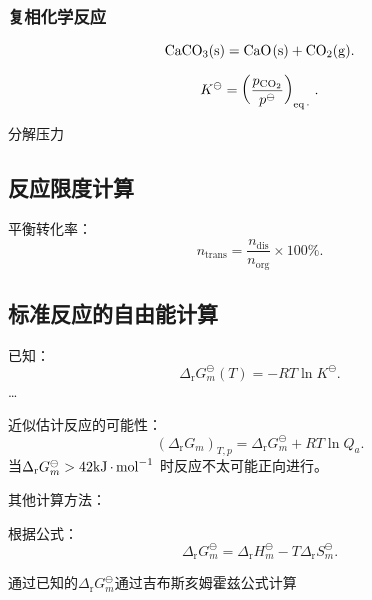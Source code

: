 \subsubsection*{复相化学反应}%
\label{subsub*:复相化学反应}
\begin{eg}
     \[
        \ce{CaCO_3(s)}=\ce{CaO(s)}+\ce{CO_2(g)}
    .\]
\end{eg}
\[
    K^\ominus = \left( \frac{p_\text{\ce{CO2}}}{p^\ominus} \right)_{\ce{eq.}}^{}
.\]
\begin{notation}
    分解压力
\end{notation}
\subsection{反应限度计算}%
\label{sub:反应限度计算}
\begin{notation}
    平衡转化率：\[
        n_\text{trans} = \frac{n_\text{dis}}{n_\text{org}}\times 100\%
    .\]
\end{notation}
\subsection{标准反应的自由能计算}%
\label{sub:标准反应的自由能计算}
已知：\[
    \Delta_\text{r}G_{m}^\ominus \left( T \right) = -RT\ln K^\ominus
.\]\ldots 
\begin{notation}
    近似估计反应的可能性：
    \[
        \left( \Delta_\text{r}G_{m}  \right)_{T,p} = \Delta_\text{r}G_{m}^\ominus +RT\ln Q_{a}
    .\]
    当$\Delta_\text{r}G_{m}^\ominus >42\ce{kJ*mol^{-1}}$ 时反应不太可能正向进行。
\end{notation}
其他计算方法：
\begin{notation}
    根据公式：\[
        \Delta_\text{r}G_{m}^\ominus = \Delta_\text{r}H_{m}^\ominus -T\Delta_\text{r}S_{m}^\ominus 
    .\]
\end{notation}
\begin{notation}
    通过已知的$\Delta_\text{r}G_{m}^\ominus $通过吉布斯亥姆霍兹公式计算
\end{notation}


